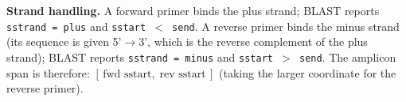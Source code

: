 \begin{tcolorbox}[
  title={\textbf{Box 2: How BLAST works}},
  colback=orange!3!white, colframe=orange!50!black,
  fonttitle=\small\bfseries,
  left=6pt, right=6pt, top=4pt, bottom=4pt
]
\medskip
\textbf{Strand handling.} A forward primer binds the plus strand; BLAST reports
\texttt{sstrand = plus} and \texttt{sstart $<$ send}. A reverse primer binds the
minus strand (its sequence is given 5'$\to$3', which is the reverse complement of
the plus strand); BLAST reports \texttt{sstrand = minus} and \texttt{sstart $>$ send}.
The amplicon span is therefore: $[\,\text{fwd sstart},\;\text{rev sstart}\,]$
(taking the larger coordinate for the reverse primer).

\end{tcolorbox}
